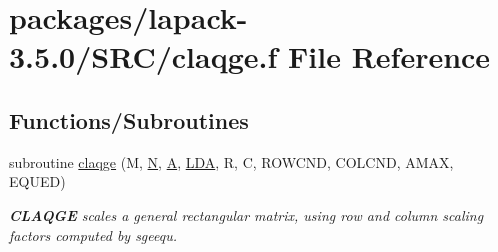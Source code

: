 \hypertarget{claqge_8f}{}\section{packages/lapack-\/3.5.0/\+S\+R\+C/claqge.f File Reference}
\label{claqge_8f}
\subsection*{Functions/\+Subroutines}
\begin{DoxyCompactItemize}
\item 
subroutine \hyperlink{group__complexGEauxiliary_gaddbe8e0a9373921a87eb7ae22f92a530}{claqge} (M, \hyperlink{polmisc_8c_a0240ac851181b84ac374872dc5434ee4}{N}, \hyperlink{classA}{A}, \hyperlink{example__user_8c_ae946da542ce0db94dced19b2ecefd1aa}{L\+D\+A}, R, C, R\+O\+W\+C\+N\+D, C\+O\+L\+C\+N\+D, A\+M\+A\+X, E\+Q\+U\+E\+D)
\begin{DoxyCompactList}\small\item\em {\bfseries C\+L\+A\+Q\+G\+E} scales a general rectangular matrix, using row and column scaling factors computed by sgeequ. \end{DoxyCompactList}\end{DoxyCompactItemize}

